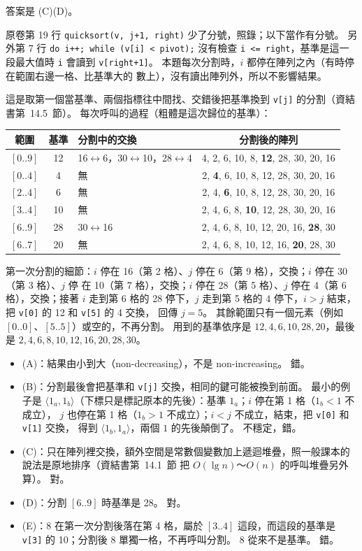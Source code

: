 \begin{pastsoln}
答案是 (C)(D)。

原卷第 19 行 \texttt{quicksort(v, j+1, right)} 少了分號，照錄；以下當作有分號。 另外第 7 行
\texttt{do i++; while (v[i] < pivot);} 沒有檢查 \texttt{i <= right}，基準是這一段最大值時 \texttt{i}
會讀到 \texttt{v[right+1]}。 本題每次分割時，$i$ 都停在陣列之內（有時停在範圍右邊一格、比基準大的
數上），沒有讀出陣列外，所以不影響結果。

這是取第一個當基準、兩個指標往中間找、交錯後把基準換到 \texttt{v[j]} 的分割（資結書第~14.5~節）。
每次呼叫的過程（粗體是這次歸位的基準）：
\begin{center}
\small
\begin{tabular}{cclc}
\toprule
範圍 & 基準 & 分割中的交換 & 分割後的陣列 \\
\midrule
$[0..9]$ & 12 & 16$\leftrightarrow$6，30$\leftrightarrow$10，28$\leftrightarrow$4 &
4, 2, 6, 10, 8, \textbf{12}, 28, 30, 20, 16 \\
$[0..4]$ & 4 & 無 & 2, \textbf{4}, 6, 10, 8, 12, 28, 30, 20, 16 \\
$[2..4]$ & 6 & 無 & 2, 4, \textbf{6}, 10, 8, 12, 28, 30, 20, 16 \\
$[3..4]$ & 10 & 無 & 2, 4, 6, 8, \textbf{10}, 12, 28, 30, 20, 16 \\
$[6..9]$ & 28 & 30$\leftrightarrow$16 & 2, 4, 6, 8, 10, 12, 20, 16, \textbf{28}, 30 \\
$[6..7]$ & 20 & 無 & 2, 4, 6, 8, 10, 12, 16, \textbf{20}, 28, 30 \\
\bottomrule
\end{tabular}
\end{center}
第一次分割的細節：$i$ 停在 16（第 2 格）、$j$ 停在 6（第 9 格），交換；$i$ 停在 30（第 3 格）、$j$ 停
在 10（第 7 格），交換；$i$ 停在 28（第 5 格）、$j$ 停在 4（第 6 格），交換；接著 $i$ 走到第 6 格的
28 停下，$j$ 走到第 5 格的 4 停下，$i > j$ 結束，把 \texttt{v[0]} 的 12 和 \texttt{v[5]} 的 4 交換，
回傳 $j = 5$。 其餘範圍只有一個元素（例如 $[0..0]$、$[5..5]$）或空的，不再分割。 用到的基準依序是
$12, 4, 6, 10, 28, 20$，最後是 $2, 4, 6, 8, 10, 12, 16, 20, 28, 30$。
\begin{itemize}
\item (A)：結果由小到大（non-decreasing），不是 non-increasing。 錯。
\item (B)：分割最後會把基準和 \texttt{v[j]} 交換，相同的鍵可能被換到前面。 最小的例子是
$\langle 1_a, 1_b \rangle$（下標只是標記原本的先後）：基準 $1_a$；$i$ 停在第 1 格（$1_b < 1$ 不成立），
$j$ 也停在第 1 格（$1_b > 1$ 不成立）；$i < j$ 不成立，結束，把 \texttt{v[0]} 和 \texttt{v[1]} 交換，
得到 $\langle 1_b, 1_a \rangle$，兩個 $1$ 的先後顛倒了。 不穩定，錯。
\item (C)：只在陣列裡交換，額外空間是常數個變數加上遞迴堆疊，照一般課本的說法是原地排序（資結書第~14.1~節
把 $O(\lg n)$～$O(n)$ 的呼叫堆疊另外算）。 對。
\item (D)：分割 $[6..9]$ 時基準是 28。 對。
\item (E)：8 在第一次分割後落在第 4 格，屬於 $[3..4]$ 這段，而這段的基準是 \texttt{v[3]} 的 10；分割後
8 單獨一格，不再呼叫分割。 8 從來不是基準。 錯。
\end{itemize}
\end{pastsoln}
